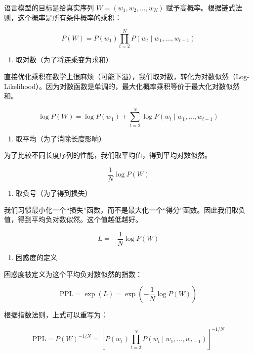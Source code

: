 语言模型的目标是给真实序列 \(W=(w_1,w_2,\ldots,w_N)\) 赋予高概率。根据链式法则，这个概率是所有条件概率的乘积：

\[
P(W)=P(w_1)\prod_{t=2}^{N}P(w_t\mid w_1,\ldots,w_{t-1})
\]

\begin{enumerate}
\def\labelenumi{\arabic{enumi}.}
\setcounter{enumi}{1}
\tightlist
\item
  取对数（为了将连乘变为求和）
\end{enumerate}

直接优化乘积在数学上很麻烦（可能下溢），我们取对数，转化为对数似然（Log-Likelihood）。因为对数函数是单调的，最大化概率乘积等价于最大化对数似然和。

\[
\log P(W)=\log P(w_1)+\sum_{t=2}^{N}\log P(w_t\mid w_1,\ldots,w_{t-1})
\]

\begin{enumerate}
\def\labelenumi{\arabic{enumi}.}
\setcounter{enumi}{2}
\tightlist
\item
  取平均（为了消除长度影响）
\end{enumerate}

为了比较不同长度序列的性能，我们取平均值，得到平均对数似然。

\[
\frac{1}{N}\log P(W)
\]

\begin{enumerate}
\def\labelenumi{\arabic{enumi}.}
\setcounter{enumi}{3}
\tightlist
\item
  取负号（为了得到损失）
\end{enumerate}

我们习惯最小化一个``损失''函数，而不是最大化一个``得分''函数。因此我们取负值，得到平均负对数似然。这个值越低越好。

\[
L=-\frac{1}{N}\log P(W)
\]

\begin{enumerate}
\def\labelenumi{\arabic{enumi}.}
\setcounter{enumi}{4}
\tightlist
\item
  困惑度的定义
\end{enumerate}

困惑度被定义为这个平均负对数似然的指数：

\[
\mathrm{PPL}=\exp(L)=\exp\left(-\frac{1}{N}\log P(W)\right)
\]

根据指数法则，上式可以重写为：

\[
\mathrm{PPL}=P(W)^{-1/N}
=\left[P(w_1)\prod_{t=2}^{N}P(w_t\mid w_1,\ldots,w_{t-1})\right]^{-1/N}
\]

